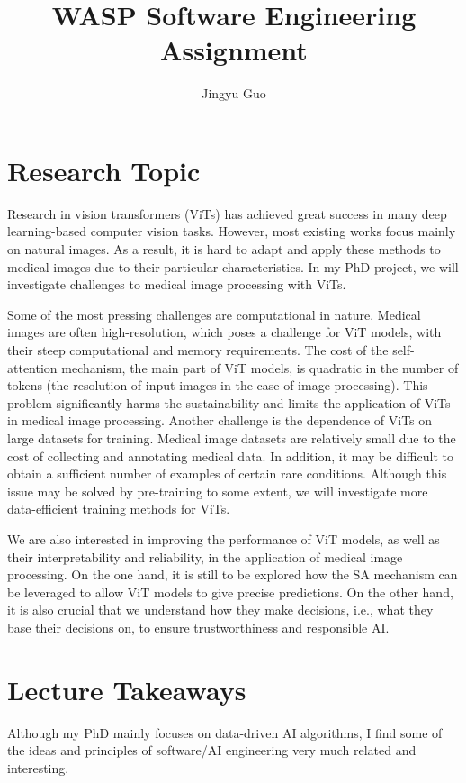 \documentclass[11pt]{article}
\title{WASP Software Engineering Assignment}
\author{Jingyu Guo}
\begin{document}
\maketitle


\section{Research Topic}

Research in vision transformers
(ViTs) has achieved great success in many deep learning-based computer vision tasks. 
However, most existing works focus mainly on natural images. As a result, it is hard to adapt and apply these methods to medical images due to their particular characteristics.
In my PhD project, we will investigate challenges to medical image processing with ViTs.

Some of the most pressing challenges are computational in nature. 
Medical images are often high-resolution, which poses a challenge for ViT models, with their steep computational and memory requirements. 
The cost of the self-attention mechanism, the main part of ViT models, is quadratic in the number of tokens (the resolution of input images in the case of image processing). 
This problem significantly harms the sustainability and limits the application of ViTs in medical image processing.
Another challenge is the dependence of ViTs on large datasets for training. Medical image datasets are relatively small due to the cost of collecting and annotating medical data. 
In addition, it may be difficult to obtain a sufficient number of examples of certain rare conditions.
Although this issue may be solved by pre-training to some extent, we will investigate more data-efficient training methods for ViTs.

We are also interested in improving the performance of ViT models, as well as their
interpretability and reliability, in the application of medical image processing. 
On the one hand, it is still to be explored how the SA mechanism can be leveraged to allow ViT models to give precise predictions.
On the other hand, it is also crucial that we understand how they make decisions, i.e., what they base their decisions on, to ensure trustworthiness and responsible AI.


\section{Lecture Takeaways}

Although my PhD mainly focuses on data-driven AI algorithms, I find some of the ideas and principles of software/AI engineering very much related and interesting.
\end{document}
